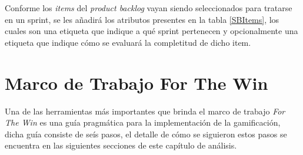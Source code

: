  \noindent Conforme los {\it items} del {\it product backlog} vayan siendo seleccionados para
 tratarse en un sprint, se les añadirá los atributos presentes en la tabla \ref{SBItems}, los
 cuales son una etiqueta que indique a qué sprint pertenecen y opcionalmente una etiqueta que
 indique cómo se evaluará la completitud de dicho item.
    


\section{Marco de Trabajo For The Win}
\label{analisis:forthewin}

 Una de las herramientas más importantes que brinda el marco de trabajo {\it For The Win} es
 una guía pragmática para la implementación de la gamificación, dicha guía consiste de seís
 pasos, el detalle de cómo se siguieron estos pasos se encuentra en las siguientes secciones
 de este capítulo de análisis.

